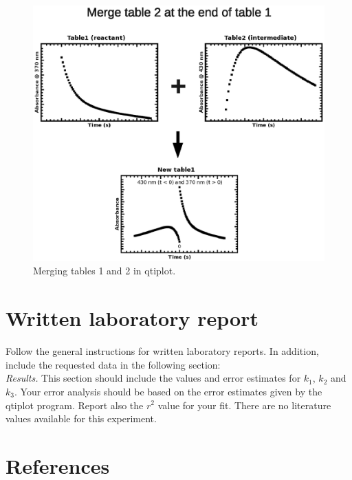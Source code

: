 \documentclass[byrevtex,amssymb,aps,pra,floatfix,letterpaper]{revtex4}
\begin{document}
\begin{figure}[!htp]
\begin{center}
\includegraphics[scale=0.8]{merge}
\caption{Merging tables 1 and 2 in qtiplot.}
\label{merge}
\end{center}
\end{figure}

\section{Written laboratory report}

Follow the general instructions for written laboratory reports. In addition, include the requested data in the following section:\\

\noindent
\textit{Results.} This section should include the values and error estimates for $k_1$, $k_2$ and $k_3$. Your error analysis should be based on the error estimates given by the qtiplot program. Report also the $r^2$ value for your fit. There are no literature values available for this experiment.

\section{References}

\vspace{-1cm}


\end{document}
